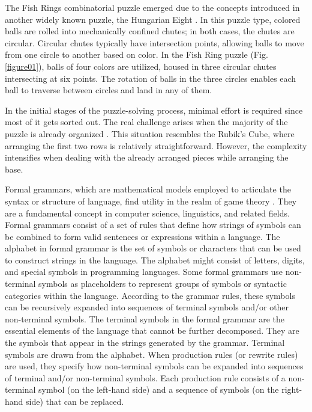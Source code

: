 \documentclass[a4paper,twocolumn,10pt]{article}
\begin{document}
The Fish Rings combinatorial puzzle emerged due to the concepts introduced in another widely known puzzle, the Hungarian Eight \cite{kornhauser1984coordinating}. In this puzzle type, colored balls are rolled into mechanically confined chutes; in both cases, the chutes are circular. Circular chutes typically have intersection points, allowing balls to move from one circle to another based on color. In the Fish Ring puzzle (Fig. \ref{figure01}), balls of four colors are utilized, housed in three circular chutes intersecting at six points. The rotation of balls in the three circles enables each ball to traverse between circles and land in any of them.

In the initial stages of the puzzle-solving process, minimal effort is required since most of it gets sorted out. The real challenge arises when the majority of the puzzle is already organized \cite{van2013complexity}. This situation resembles the Rubik's Cube, where arranging the first two rows is relatively straightforward. However, the complexity intensifies when dealing with the already arranged pieces while arranging the base.

Formal grammars, which are mathematical models employed to articulate the syntax or structure of language, find utility in the realm of game theory \cite{9231594}. They are a fundamental concept in computer science, linguistics, and related fields. Formal grammars consist of a set of rules that define how strings of symbols can be combined to form valid sentences or expressions within a language. The alphabet in formal grammar is the set of symbols or characters that can be used to construct strings in the language. The alphabet might consist of letters, digits, and special symbols in programming languages. Some formal grammars use non-terminal symbols \cite{10.1111/j.1467-8659.2010.01714.x} as placeholders to represent groups of symbols or syntactic categories within the language. According to the grammar rules, these symbols can be recursively expanded into sequences of terminal symbols and/or other non-terminal symbols. The terminal symbols in the formal grammar are the essential elements of the language that cannot be further decomposed. They are the symbols that appear in the strings generated by the grammar. Terminal symbols are drawn from the alphabet. When production rules (or rewrite rules) are used, they specify how non-terminal symbols can be expanded into sequences of terminal and/or non-terminal symbols. Each production rule consists of a non-terminal symbol (on the left-hand side) and a sequence of symbols (on the right-hand side) that can be replaced.
\end{document}
